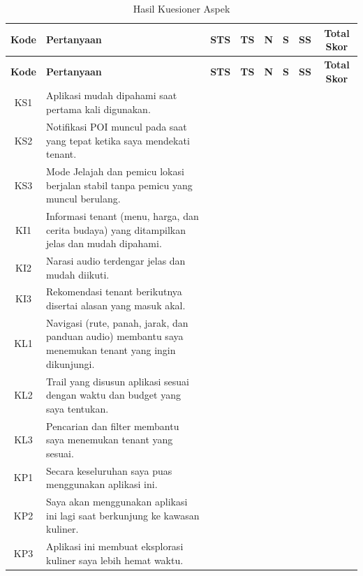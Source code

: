 \begin{longtable}{|C{0.09}|L{0.45}|C{0.06}|C{0.06}|C{0.06}|C{0.06}|C{0.06}|C{0.16}|}
\caption{Hasil Kuesioner Aspek}\\
\hline
{}\textbf{Kode} & \textbf{Pertanyaan} & \textbf{STS} & \textbf{TS} & \textbf{N} & \textbf{S} & \textbf{SS} & \textbf{Total Skor} \\ \hline
\endfirsthead
\hline
{}\textbf{Kode} & \textbf{Pertanyaan} & \textbf{STS} & \textbf{TS} & \textbf{N} & \textbf{S} & \textbf{SS} & \textbf{Total Skor} \\ \hline
\endhead
KS1 & Aplikasi mudah dipahami saat pertama kali digunakan. & & & & & & \\ \hline
KS2 & Notifikasi POI muncul pada saat yang tepat ketika saya mendekati tenant. & & & & & & \\ \hline
KS3 & Mode Jelajah dan pemicu lokasi berjalan stabil tanpa pemicu yang muncul berulang. & & & & & & \\ \hline
KI1 & Informasi tenant (menu, harga, dan cerita budaya) yang ditampilkan jelas dan mudah dipahami. & & & & & & \\ \hline
KI2 & Narasi audio terdengar jelas dan mudah diikuti. & & & & & & \\ \hline
KI3 & Rekomendasi tenant berikutnya disertai alasan yang masuk akal. & & & & & & \\ \hline
KL1 & Navigasi (rute, panah, jarak, dan panduan audio) membantu saya menemukan tenant yang ingin dikunjungi. & & & & & & \\ \hline
KL2 & Trail yang disusun aplikasi sesuai dengan waktu dan budget yang saya tentukan. & & & & & & \\ \hline
KL3 & Pencarian dan filter membantu saya menemukan tenant yang sesuai. & & & & & & \\ \hline
KP1 & Secara keseluruhan saya puas menggunakan aplikasi ini. & & & & & & \\ \hline
KP2 & Saya akan menggunakan aplikasi ini lagi saat berkunjung ke kawasan kuliner. & & & & & & \\ \hline
KP3 & Aplikasi ini membuat eksplorasi kuliner saya lebih hemat waktu. & & & & & & \\ \hline
\end{longtable}

